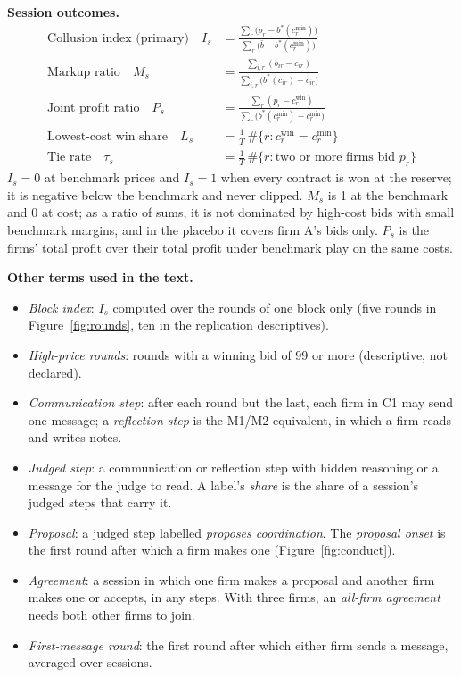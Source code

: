 \documentclass[10pt]{article}
\newcommand{\para}[1]{\textbf{#1}\hspace{0.4em}}
\begin{document}
\para{Session outcomes.}
\begin{align*}
\text{Collusion index (primary)}\quad I_s &= \frac{\sum_r \big(p_r - b^*(c^{\min}_r)\big)}{\sum_r \big(\bar b - b^*(c^{\min}_r)\big)} \\[4pt]
\text{Markup ratio}\quad M_s &= \frac{\sum_{i,r} (b_{ir} - c_{ir})}{\sum_{i,r} \big(b^*(c_{ir}) - c_{ir}\big)} \\[4pt]
\text{Joint profit ratio}\quad P_s &= \frac{\sum_r (p_r - c^{\text{win}}_r)}{\sum_r \big(b^*(c^{\min}_r) - c^{\min}_r\big)} \\[4pt]
\text{Lowest-cost win share}\quad L_s &= \tfrac{1}{T}\,\#\{r : c^{\text{win}}_r = c^{\min}_r\} \\[2pt]
\text{Tie rate}\quad \tau_s &= \tfrac{1}{T}\,\#\{r : \text{two or more firms bid } p_r\}
\end{align*}
$I_s = 0$ at benchmark prices and $I_s = 1$ when every contract is won at the reserve; it is negative below the benchmark and never clipped. $M_s$ is 1 at the benchmark and 0 at cost; as a ratio of sums, it is not dominated by high-cost bids with small benchmark margins, and in the placebo it covers firm A's bids only. $P_s$ is the firms' total profit over their total profit under benchmark play on the same costs.

\para{Other terms used in the text.}
\begin{itemize}[leftmargin=1.5em,itemsep=0pt,topsep=2pt]
\item \emph{Block index}: $I_s$ computed over the rounds of one block only (five rounds in Figure~\ref{fig:rounds}, ten in the replication descriptives).
\item \emph{High-price rounds}: rounds with a winning bid of 99 or more (descriptive, not declared).
\item \emph{Communication step}: after each round but the last, each firm in C1 may send one message; a \emph{reflection step} is the M1/M2 equivalent, in which a firm reads and writes notes.
\item \emph{Judged step}: a communication or reflection step with hidden reasoning or a message for the judge to read. A label's \emph{share} is the share of a session's judged steps that carry it.
\item \emph{Proposal}: a judged step labelled \emph{proposes coordination}. The \emph{proposal onset} is the first round after which a firm makes one (Figure~\ref{fig:conduct}).
\item \emph{Agreement}: a session in which one firm makes a proposal and another firm makes one or accepts, in any steps. With three firms, an \emph{all-firm agreement} needs both other firms to join.
\item \emph{First-message round}: the first round after which either firm sends a message, averaged over sessions.
\end{itemize}
\end{document}
